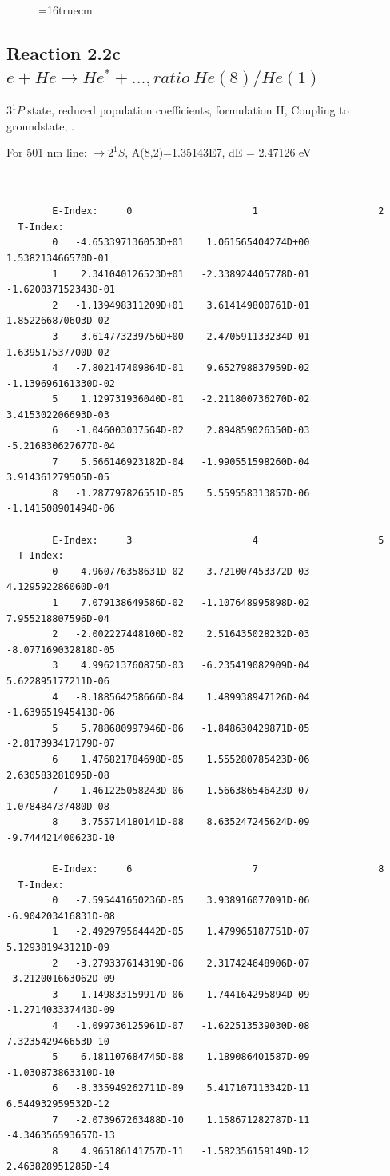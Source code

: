 \documentclass[12pt,dvips]{article}
\begin{document}
\begin{figure} \label{2.2b}
\epsfxsize=16truecm
\end{figure}
\newpage


\subsection{
  Reaction 2.2c $e + He \rightarrow He^* + ...,  ratio ~ He(8)/He(1)$
}

  $3^1P$ state,
  reduced population coefficients, formulation II,
  Coupling to groundstate, \cite{kn:Fujimoto}.

  For 501 nm line: $\rightarrow 2^1S$, A(8,2)=1.35143E7, dE = 2.47126 eV

\begin{small}\begin{verbatim}


        E-Index:     0                     1                     2
  T-Index:
        0   -4.653397136053D+01    1.061565404274D+00    1.538213466570D-01
        1    2.341040126523D+01   -2.338924405778D-01   -1.620037152343D-01
        2   -1.139498311209D+01    3.614149800761D-01    1.852266870603D-02
        3    3.614773239756D+00   -2.470591133234D-01    1.639517537700D-02
        4   -7.802147409864D-01    9.652798837959D-02   -1.139696161330D-02
        5    1.129731936040D-01   -2.211800736270D-02    3.415302206693D-03
        6   -1.046003037564D-02    2.894859026350D-03   -5.216830627677D-04
        7    5.566146923182D-04   -1.990551598260D-04    3.914361279505D-05
        8   -1.287797826551D-05    5.559558313857D-06   -1.141508901494D-06

        E-Index:     3                     4                     5
  T-Index:
        0   -4.960776358631D-02    3.721007453372D-03    4.129592286060D-04
        1    7.079138649586D-02   -1.107648995898D-02    7.955218807596D-04
        2   -2.002227448100D-02    2.516435028232D-03   -8.077169032818D-05
        3    4.996213760875D-03   -6.235419082909D-04    5.622895177211D-06
        4   -8.188564258666D-04    1.489938947126D-04   -1.639651945413D-06
        5    5.788680997946D-06   -1.848630429871D-05   -2.817393417179D-07
        6    1.476821784698D-05    1.555280785423D-06    2.630583281095D-08
        7   -1.461225058243D-06   -1.566386546423D-07    1.078484737480D-08
        8    3.755714180141D-08    8.635247245624D-09   -9.744421400623D-10

        E-Index:     6                     7                     8
  T-Index:
        0   -7.595441650236D-05    3.938916077091D-06   -6.904203416831D-08
        1   -2.492979564442D-05    1.479965187751D-07    5.129381943121D-09
        2   -3.279337614319D-06    2.317424648906D-07   -3.212001663062D-09
        3    1.149833159917D-06   -1.744164295894D-09   -1.271403337443D-09
        4   -1.099736125961D-07   -1.622513539030D-08    7.323542946653D-10
        5    6.181107684745D-08    1.189086401587D-09   -1.030873863310D-10
        6   -8.335949262711D-09    5.417107113342D-11    6.544932959532D-12
        7   -2.073967263488D-10    1.158671282787D-11   -4.346356593657D-13
        8    4.965186141757D-11   -1.582356159149D-12    2.463828951285D-14


\end{verbatim}
\end{small}
\end{document}

